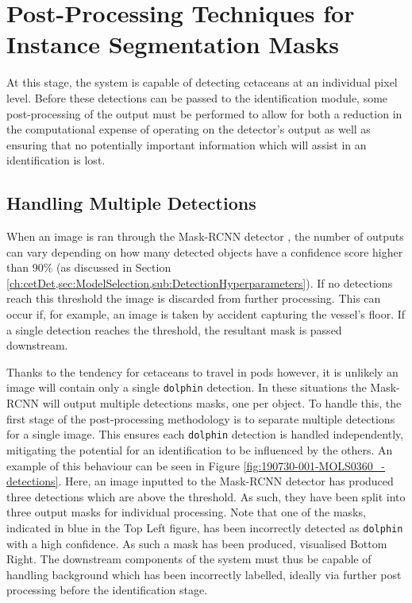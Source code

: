 \chapter{Post-Processing Techniques for Instance Segmentation Masks}\label{ch:postProcessing}

At this stage, the system is capable of detecting cetaceans at an individual pixel level. Before these detections can be passed to the identification module, some post-processing of the output must be performed to allow for both a reduction in the computational expense of operating on the detector's output as well as ensuring that no potentially important information which will assist in an identification is lost. 

\section{Handling Multiple Detections}\label{ch:postProcessing,sec:handlingMultipleDetections}

When an image is ran through the Mask-RCNN detector \cite{he_mask_2017}, the number of outputs can vary depending on how many detected objects have a confidence score higher than 90\% (as discussed in Section \ref{ch:cetDet,sec:ModelSelection,sub:DetectionHyperparameters}). If no detections reach this threshold the image is discarded from further processing. This can occur if, for example, an image is taken by accident capturing the vessel's floor. If a single detection reaches the threshold, the resultant mask is passed downstream. 

Thanks to the tendency for cetaceans to travel in pods however, it is unlikely an image will contain only a single \texttt{dolphin} detection. In these situations the Mask-RCNN will output multiple detections masks, one per object. To handle this, the first stage of the post-processing methodology is to separate multiple detections for a single image. This ensures each \texttt{dolphin} detection is handled independently, mitigating the potential for an identification to be influenced by the others. An example of this behaviour can be seen in Figure \ref{fig:190730-001-MOLS0360_-detections}. Here, an image inputted to the Mask-RCNN detector has produced three detections which are above the threshold. As such, they have been split into three output masks for individual processing. Note that one of the masks, indicated in blue in the Top Left figure, has been incorrectly detected as \texttt{dolphin} with a high confidence. As such a mask has been produced, visualised Bottom Right. The downstream components of the system must thus be capable of handling background which has been incorrectly labelled, ideally via further post processing before the identification stage. 

